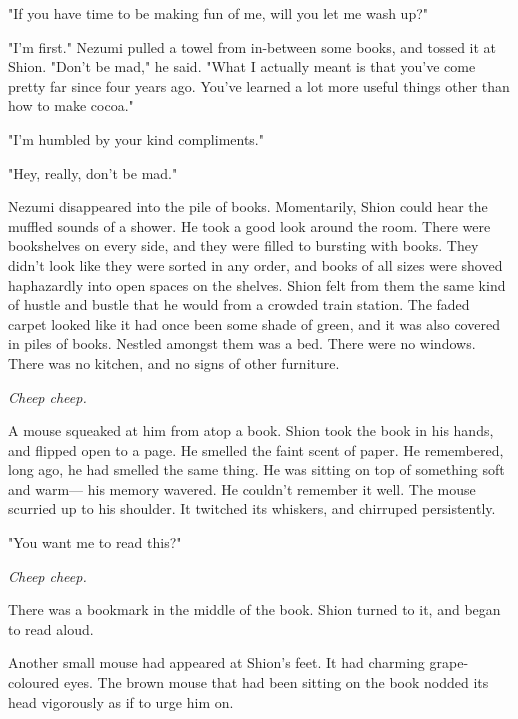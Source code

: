 "If you have time to be making fun of me, will you let me wash up?"

"I'm first." Nezumi pulled a towel from in-between some books, and
tossed it at Shion. "Don't be mad," he said. "What I actually meant is
that you've come pretty far since four years ago. You've learned a lot
more useful things other than how to make cocoa."

"I'm humbled by your kind compliments."

"Hey, really, don't be mad."

Nezumi disappeared into the pile of books. Momentarily, Shion could hear
the muffled sounds of a shower. He took a good look around the room.
There were bookshelves on every side, and they were filled to bursting
with books. They didn't look like they were sorted in any order, and
books of all sizes were shoved haphazardly into open spaces on the
shelves. Shion felt from them the same kind of hustle and bustle that he
would from a crowded train station. The faded carpet looked like it had
once been some shade of green, and it was also covered in piles of
books. Nestled amongst them was a bed. There were no windows. There was
no kitchen, and no signs of other furniture.

\emph{Cheep cheep.}

A mouse squeaked at him from atop a book. Shion took the book in his
hands, and flipped open to a page. He smelled the faint scent of paper.
He remembered, long ago, he had smelled the same thing. He was sitting
on top of something soft and warm--- his memory wavered. He couldn't
remember it well. The mouse scurried up to his shoulder. It twitched its
whiskers, and chirruped persistently.

"You want me to read this?"

\emph{Cheep cheep.}

There was a bookmark in the middle of the book. Shion turned to it, and
began to read aloud.


Another small mouse had appeared at Shion's feet. It had charming
grape-coloured eyes. The brown mouse that had been sitting on the book
nodded its head vigorously as if to urge him on.

